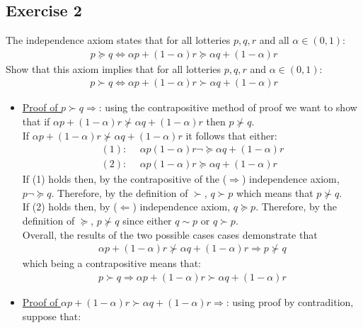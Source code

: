 \documentclass{article}
\begin{document}
\subsection{Exercise 2}
The independence axiom states that for all lotteries $p,q,r $ and all $\alpha \in (0,1)$:
\begin{gather*}
  p \succeq q \Leftrightarrow \alpha p + (1-\alpha)r \succeq \alpha q + (1-\alpha)r
\end{gather*}
Show that this axiom implies that for all lotteries $p,q,r$ and $\alpha \in (0,1)$:
\begin{gather*}
  p \succ q \Leftrightarrow \alpha p + (1-\alpha)r \succ \alpha q + (1-\alpha)r
\end{gather*}
\par \vspace{0.3em}
  \begin{itemize}
    \item  \underline{Proof of $p \succ q \Rightarrow$}: using the contrapositive method of proof we want to show that if $\alpha p + (1 - \alpha) r \nsucc \alpha q + (1- \alpha)r$ then $p \nsucc q$. \\
    If $\alpha p + (1 - \alpha) r \nsucc \alpha q + (1- \alpha)r$ it follows that either:
    \begin{align*}
      (1):& \ \ \alpha p (1-\alpha)r \lnot \succeq \alpha q + (1-\alpha) r \\
      (2):& \ \ \alpha p (1-\alpha)r \succeq \alpha q + (1-\alpha) r
    \end{align*}
    If (1) holds then, by the contrapositive of the ($\Rightarrow$) independence axiom, $p \lnot \succeq q$. Therefore, by the definition of $\succ$, $q \succ p$ which means that $p \nsucc q$. \\
    If (2) holds then, by ($\Leftarrow$) independence axiom, $q \succeq p$. Therefore, by the definition of $\succeq$, $p \nsucc q$ since either $q \sim p$ or $q \succ p$. \\
    Overall, the results of the two possible cases cases demonstrate that
    \begin{gather*}
      \alpha p + (1 - \alpha) r \nsucc \alpha q + (1- \alpha)r  \Rightarrow p \nsucc q
    \end{gather*}
    which being a contrapositive means that:
    \begin{gather*}
      p \succ q \Rightarrow \alpha p + (1-\alpha)r \succ \alpha q + (1-\alpha)r
    \end{gather*}
    \item  \underline{Proof of $\alpha p + (1-\alpha)r \succ \alpha q + (1-\alpha)r \Rightarrow$}: using proof by contradition, suppose that:

\end{itemize}
\end{document}

